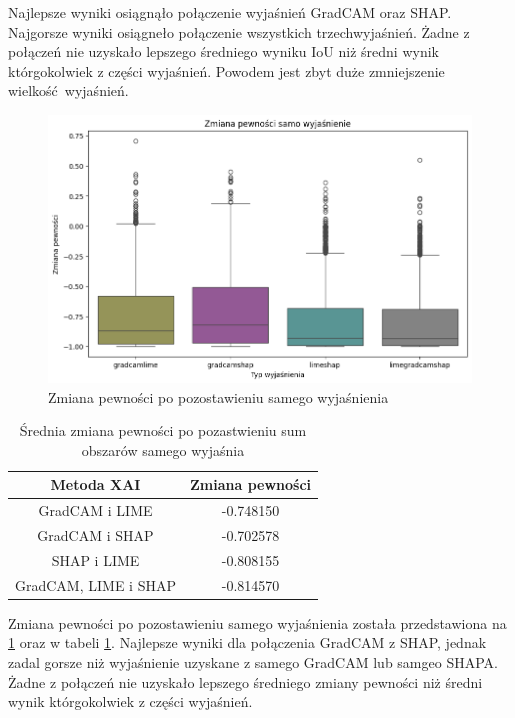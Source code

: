 Najlepsze wyniki osiągnąło połączenie wyjaśnień GradCAM oraz SHAP.
Najgorsze wyniki osiągneło połączenie wszystkich trzechwyjaśnień.
Żadne z połączeń nie uzyskało lepszego średniego wyniku  IoU niż średni wynik którgokolwiek z części wyjaśnień.
Powodem jest zbyt duże zmniejszenie wielkość wyjaśnień.

\begin{figure}[h]
	\centering\includegraphics[width=.9\textwidth]{img/combine_confidence_exp_and}
	\caption{Zmiana pewności po pozostawieniu samego wyjaśnienia}  \label{rys:combineandconfidencean}
\end{figure}
\begin{table}[h]
	\centering
	\begin{tabular}{|c|c|}
		\hline
		\textbf{Metoda XAI}  & Zmiana pewności \\
		\hline
		GradCAM i LIME       & -0.748150       \\
		\hline
		GradCAM i SHAP       & -0.702578       \\
		\hline
		SHAP i LIME          & -0.808155       \\
		\hline
		GradCAM, LIME i SHAP & -0.814570       \\
		\hline
	\end{tabular}
	\caption{Średnia zmiana pewności po pozastwieniu sum obszarów samego wyjaśnia}
	\label{tab:combineandconfidenceand}
\end{table}
Zmiana pewności po pozostawieniu samego wyjaśnienia została przedstawiona na \ref{rys:combineandconfidencean} oraz w tabeli \ref{tab:combineandconfidenceand}.
Najlepsze wyniki dla połączenia GradCAM z SHAP, jednak zadal gorsze niż wyjaśnienie uzyskane z samego GradCAM lub samgeo SHAPA.
Żadne z połączeń nie uzyskało lepszego średniego zmiany pewności niż średni wynik którgokolwiek z części wyjaśnień.

